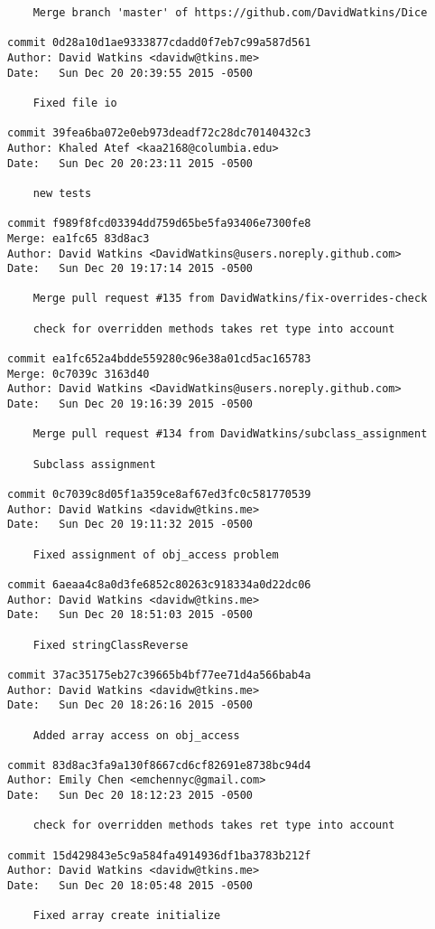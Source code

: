 \begin{verbatim}
    Merge branch 'master' of https://github.com/DavidWatkins/Dice

commit 0d28a10d1ae9333877cdadd0f7eb7c99a587d561
Author: David Watkins <davidw@tkins.me>
Date:   Sun Dec 20 20:39:55 2015 -0500

    Fixed file io

commit 39fea6ba072e0eb973deadf72c28dc70140432c3
Author: Khaled Atef <kaa2168@columbia.edu>
Date:   Sun Dec 20 20:23:11 2015 -0500

    new tests

commit f989f8fcd03394dd759d65be5fa93406e7300fe8
Merge: ea1fc65 83d8ac3
Author: David Watkins <DavidWatkins@users.noreply.github.com>
Date:   Sun Dec 20 19:17:14 2015 -0500

    Merge pull request #135 from DavidWatkins/fix-overrides-check
    
    check for overridden methods takes ret type into account

commit ea1fc652a4bdde559280c96e38a01cd5ac165783
Merge: 0c7039c 3163d40
Author: David Watkins <DavidWatkins@users.noreply.github.com>
Date:   Sun Dec 20 19:16:39 2015 -0500

    Merge pull request #134 from DavidWatkins/subclass_assignment
    
    Subclass assignment

commit 0c7039c8d05f1a359ce8af67ed3fc0c581770539
Author: David Watkins <davidw@tkins.me>
Date:   Sun Dec 20 19:11:32 2015 -0500

    Fixed assignment of obj_access problem

commit 6aeaa4c8a0d3fe6852c80263c918334a0d22dc06
Author: David Watkins <davidw@tkins.me>
Date:   Sun Dec 20 18:51:03 2015 -0500

    Fixed stringClassReverse

commit 37ac35175eb27c39665b4bf77ee71d4a566bab4a
Author: David Watkins <davidw@tkins.me>
Date:   Sun Dec 20 18:26:16 2015 -0500

    Added array access on obj_access

commit 83d8ac3fa9a130f8667cd6cf82691e8738bc94d4
Author: Emily Chen <emchennyc@gmail.com>
Date:   Sun Dec 20 18:12:23 2015 -0500

    check for overridden methods takes ret type into account

commit 15d429843e5c9a584fa4914936df1ba3783b212f
Author: David Watkins <davidw@tkins.me>
Date:   Sun Dec 20 18:05:48 2015 -0500

    Fixed array create initialize


\end{verbatim}
